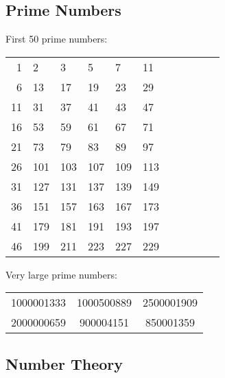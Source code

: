 \documentclass[twocolumn]{article}
\begin{document}
\subsection{Prime Numbers}

First 50 prime numbers:\\
\begin{center}
    \begin{tabular}{r|llllllllll}
        1 & 2 & 3 & 5 & 7 & 11 \\
        6 & 13 & 17 & 19 & 23 & 29 \\
        11 & 31 & 37 & 41 & 43 & 47 \\
        16 & 53 & 59 & 61 & 67 & 71 \\
        21 & 73 & 79 & 83 & 89 & 97 \\
        26 & 101 & 103 & 107 & 109 & 113 \\
        31 & 127 & 131 & 137 & 139 & 149 \\
        36 & 151 & 157 & 163 & 167 & 173 \\
        41 & 179 & 181 & 191 & 193 & 197 \\
        46 & 199 & 211 & 223 & 227 & 229
    \end{tabular}
\end{center}

Very large prime numbers:\\
\begin{tabular}{ccc}
    1000001333 & 1000500889 & 2500001909 \\
    2000000659 & 900004151 & 850001359
\end{tabular}

\subsection{Number Theory}
\end{document}
